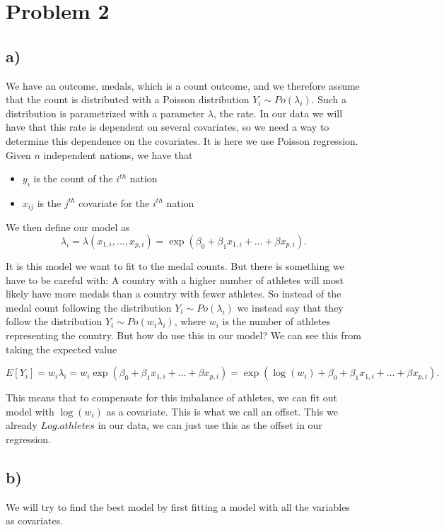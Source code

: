 \documentclass[a4paper,norsk, 10pt]{article}
\begin{document}
\section{Problem 2}
\subsection{a)}
We have an outcome, medals, which is a count outcome, and we therefore assume that the count is distributed with a Poisson distribution $Y_i \sim Po(\lambda_i)$. Such a distribution is parametrized with a parameter $\lambda$, the rate. In our data we will have that this rate is dependent on several covariates, so we need a way to determine this dependence on the covariates. It is here we use Poisson regression. Given $n$ independent nations, we have that 
\begin{itemize}
\item $y_i$ is the count of the $i^{th}$ nation
\item $x_{ij}$ is the $j^{th}$ covariate for the $i^{th}$ nation
\end{itemize}
We then define our model as 
\begin{equation}
\lambda_i = \lambda(x_{1,i},...,x_{p,i}) = \exp(\beta_0 + \beta_1 x_{1,i} + ... + \beta x_{p,i}).
\end{equation}

It is this model we want to fit to the medal counts. But there is something we have to be careful with: A country with a higher number of athletes will most likely have more medals than a country with fewer athletes. So instead of the medal count following the distribution $Y_i \sim Po(\lambda_i)$ we instead say that they follow the distribution $Y_i \sim Po(w_i\lambda_i)$, where $w_i$ is the number of athletes representing the country. But how do use this in our model? We can see this from taking the expected value

\begin{equation}
E[Y_i] = w_i \lambda_i = w_i\exp(\beta_0 + \beta_1 x_{1,i} + ... + \beta x_{p,i}) = \exp(\log(w_i) + \beta_0 + \beta_1 x_{1,i} + ... + \beta x_{p,i}).
\end{equation}

This means that to compensate for this imbalance of athletes, we can fit out model with $\log(w_i)$ as a covariate. This is what we call an offset. This we already $Log.athletes$ in our data, we can just use this as the offset in our regression.

\subsection{b)}
We will try to find the best model by first fitting a model with all the variables as covariates. 
\end{document}
